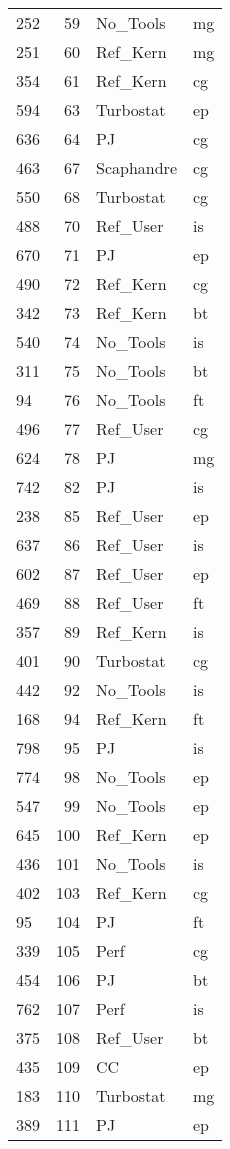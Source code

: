 \begin{tabular}{lrll}
252 & 59 & No_Tools & mg \\
251 & 60 & Ref_Kern & mg \\
354 & 61 & Ref_Kern & cg \\
594 & 63 & Turbostat & ep \\
636 & 64 & PJ & cg \\
463 & 67 & Scaphandre & cg \\
550 & 68 & Turbostat & cg \\
488 & 70 & Ref_User & is \\
670 & 71 & PJ & ep \\
490 & 72 & Ref_Kern & cg \\
342 & 73 & Ref_Kern & bt \\
540 & 74 & No_Tools & is \\
311 & 75 & No_Tools & bt \\
94 & 76 & No_Tools & ft \\
496 & 77 & Ref_User & cg \\
624 & 78 & PJ & mg \\
742 & 82 & PJ & is \\
238 & 85 & Ref_User & ep \\
637 & 86 & Ref_User & is \\
602 & 87 & Ref_User & ep \\
469 & 88 & Ref_User & ft \\
357 & 89 & Ref_Kern & is \\
401 & 90 & Turbostat & cg \\
442 & 92 & No_Tools & is \\
168 & 94 & Ref_Kern & ft \\
798 & 95 & PJ & is \\
774 & 98 & No_Tools & ep \\
547 & 99 & No_Tools & ep \\
645 & 100 & Ref_Kern & ep \\
436 & 101 & No_Tools & is \\
402 & 103 & Ref_Kern & cg \\
95 & 104 & PJ & ft \\
339 & 105 & Perf & cg \\
454 & 106 & PJ & bt \\
762 & 107 & Perf & is \\
375 & 108 & Ref_User & bt \\
435 & 109 & CC & ep \\
183 & 110 & Turbostat & mg \\
389 & 111 & PJ & ep \\

\end{tabular}
